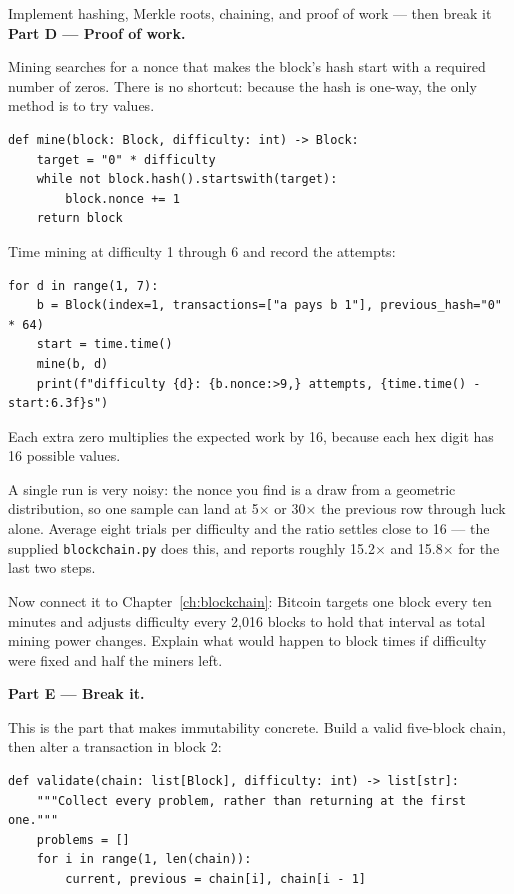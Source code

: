 \begin{labproject}{Implement hashing, Merkle roots, chaining, and proof of work --- then break it}
\medskip\noindent\textbf{Part D --- Proof of work.}\par
Mining searches for a nonce that makes the block's hash start with a required number of zeros. There is no shortcut: because the hash is one-way, the only method is to try values.

\begin{lstlisting}[style=utppython]
def mine(block: Block, difficulty: int) -> Block:
    target = "0" * difficulty
    while not block.hash().startswith(target):
        block.nonce += 1
    return block
\end{lstlisting}

\begin{tryit}
Time mining at difficulty 1 through 6 and record the attempts:

\begin{lstlisting}[style=utppython]
for d in range(1, 7):
    b = Block(index=1, transactions=["a pays b 1"], previous_hash="0" * 64)
    start = time.time()
    mine(b, d)
    print(f"difficulty {d}: {b.nonce:>9,} attempts, {time.time() - start:6.3f}s")
\end{lstlisting}

Each extra zero multiplies the expected work by 16, because each hex digit has 16 possible values.

A single run is very noisy: the nonce you find is a draw from a geometric distribution, so one sample can land at 5$\times$ or 30$\times$ the previous row through luck alone. Average eight trials per difficulty and the ratio settles close to 16 --- the supplied \texttt{blockchain.py} does this, and reports roughly 15.2$\times$ and 15.8$\times$ for the last two steps.

Now connect it to Chapter~\ref{ch:blockchain}: Bitcoin targets one block every ten minutes and adjusts difficulty every 2{,}016 blocks to hold that interval as total mining power changes. Explain what would happen to block times if difficulty were fixed and half the miners left.
\end{tryit}

\medskip\noindent\textbf{Part E --- Break it.}\par
This is the part that makes immutability concrete. Build a valid five-block chain, then alter a transaction in block 2:

\begin{lstlisting}[style=utppython]
def validate(chain: list[Block], difficulty: int) -> list[str]:
    """Collect every problem, rather than returning at the first one."""
    problems = []
    for i in range(1, len(chain)):
        current, previous = chain[i], chain[i - 1]


\end{lstlisting}
\end{labproject}
